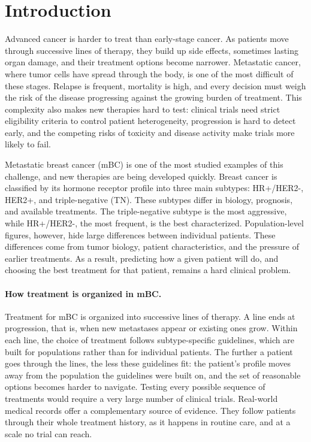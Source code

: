 \documentclass[a4paper,10pt]{article}
\title{}
\date{}
\author{}
\begin{document}
\maketitle

\section{Introduction}

Advanced cancer is harder to treat than early-stage cancer. As patients move through successive lines of therapy, they build up side effects, sometimes lasting organ damage, and their treatment options become narrower. Metastatic cancer, where tumor cells have spread through the body, is one of the most difficult of these stages. Relapse is frequent, mortality is high, and every decision must weigh the risk of the disease progressing against the growing burden of treatment. This complexity also makes new therapies hard to test: clinical trials need strict eligibility criteria to control patient heterogeneity, progression is hard to detect early, and the competing risks of toxicity and disease activity make trials more likely to fail.

Metastatic breast cancer (mBC) is one of the most studied examples of this challenge, and new therapies are being developed quickly. Breast cancer is classified by its hormone receptor profile into three main subtypes: HR+/HER2-, HER2+, and triple-negative (TN). These subtypes differ in biology, prognosis, and available treatments. The triple-negative subtype is the most aggressive, while HR+/HER2-, the most frequent, is the best characterized. Population-level figures, however, hide large differences between individual patients. These differences come from tumor biology, patient characteristics, and the pressure of earlier treatments. As a result, predicting how a given patient will do, and choosing the best treatment for that patient, remains a hard clinical problem.

\paragraph{How treatment is organized in mBC.}
Treatment for mBC is organized into successive lines of therapy. A line ends at progression, that is, when new metastases appear or existing ones grow. Within each line, the choice of treatment follows subtype-specific guidelines, which are built for populations rather than for individual patients. The further a patient goes through the lines, the less these guidelines fit: the patient's profile moves away from the population the guidelines were built on, and the set of reasonable options becomes harder to navigate. Testing every possible sequence of treatments would require a very large number of clinical trials. Real-world medical records offer a complementary source of evidence. They follow patients through their whole treatment history, as it happens in routine care, and at a scale no trial can reach.
\end{document}
